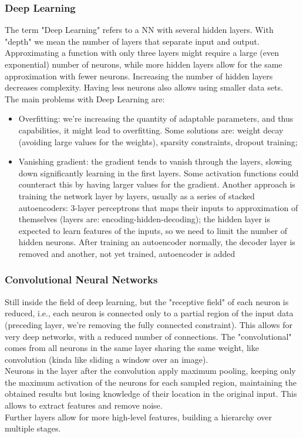 \subsubsection{Deep Learning}
The term "Deep Learning" refers to a NN with several hidden layers. With "depth" we mean the number of layers that separate input and output. \\
Approximating a function with only three layers might require a large (even exponential) number of neurons, while more hidden layers allow for the same approximation with fewer neurons. Increasing the number of hidden layers decreases complexity. Having less neurons also allows using smaller data sets.\\

The main problems with Deep Learning are: 
\begin{itemize}
	\item Overfitting: we're increasing the quantity of adaptable parameters, and thus capabilities, it might lead to overfitting. Some solutions are: weight decay (avoiding large values for the weights), sparsity constraints, dropout training; 
	\item Vanishing gradient: the gradient tends to vanish through the layers, slowing down significantly learning in the first layers. Some activation functions could counteract this by having larger values for the gradient. Another approach is training the network layer by layers, usually as a series of stacked autoencoders: 3-layer perceptrons that maps their inputs to approximation of themselves (layers are: encoding-hidden-decoding); the hidden layer is expected to learn features of the inputs, so we need to limit the number of hidden neurons. After training an autoencoder normally, the decoder layer is removed and another, not yet trained, autoencoder is added
\end{itemize}

\subsubsection{Convolutional Neural Networks}
Still inside the field of deep learning, but the "receptive field" of each neuron is reduced, i.e., each neuron is connected only to a partial region of the input data (preceding layer, we're removing the fully connected constraint). This allows for very deep networks, with a reduced number of connections. The "convolutional" comes from all neurons in the same layer sharing the same weight, like convolution (kinda like sliding a window over an image).\\
Neurons in the layer after the convolution apply maximum pooling, keeping only the maximum activation of the neurons for each sampled region, maintaining the obtained results but losing knowledge of their location in the original input. This allows to extract features and remove noise. \\
Further layers allow for more high-level features, building a hierarchy over multiple stages.\\


